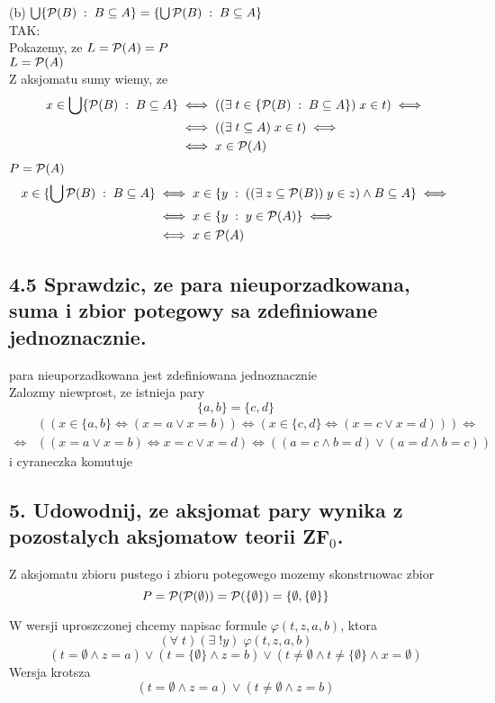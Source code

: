 \documentclass{article}
\begin{document}
\indent (b) $\bigcup\{\mathcal{P}(B)\;:\;B\subseteq A\}=\{\bigcup\mathcal{P}(B)\;:\;B\subseteq A\}$\smallskip\\
TAK:\smallskip\\
Pokazemy, ze $L= \mathcal{P}(A)= P$\smallskip\\
$L=\mathcal{P}(A)$\smallskip\\
Z aksjomatu sumy wiemy, ze
\begin{align*}
    x\in \bigcup \{\mathcal{P}(B)\;:\;B\subseteq A\}&\iff((\exists\;t\in\{\mathcal{P}(B)\;:\;B\subseteq A\})\;x\in t)\iff\\
    &\iff((\exists\;t\subseteq A)\;x\in t)\iff\\
    &\iff x\in \mathcal{P}(A)
\end{align*}
$P=\mathcal{P}(A)$
\begin{align*}
    x\in\{\bigcup\mathcal{P}(B)\;:\;B\subseteq A\}&\iff x\in \{y\;:\;((\exists\;z\subseteq \mathcal{P}(B))\;y\in z)\land B\subseteq A\}\iff\\
    &\iff x\in \{y\;:\;y\in\mathcal{P}(A)\}\iff\\
    &\iff x\in\mathcal{P}(A)
\end{align*}
\kondow

\subsection*{4.5 Sprawdzic, ze para nieuporzadkowana, suma i zbior potegowy sa zdefiniowane jednoznacznie.}
\indent para nieuporzadkowana jest zdefiniowana jednoznacznie\smallskip\\
Zalozmy niewprost, ze istnieja pary
$$\{a, b\}=\{c, d\}$$
\begin{align*}
    &((x\in\{a,b\}\iff (x=a\lor x=b))\iff (x\in \{c, d\}\iff (x=c\lor x=d)))\iff\\
    \iff&((x=a\lor x=b)\iff x=c\lor x=d)\iff ((a=c\land b=d)\lor (a=d\land b=c))
\end{align*}
i cyraneczka komutuje
\kondow

\subsection*{5. Udowodnij, ze aksjomat pary wynika z pozostalych aksjomatow teorii ZF$_0$.}

Z aksjomatu zbioru pustego i zbioru potegowego mozemy skonstruowac zbior
$$P =\mathcal{P}(\mathcal{P}(\emptyset)) = \mathcal{P}(\{\emptyset\}) = \{\emptyset, \{\emptyset\}\}$$

W wersji uproszczonej chcemy napisac formule $\varphi(t, z, a, b)$, ktora 
$$(\forall\;t)(\exists\;!y)\;\varphi(t, z, a, b)$$
$$(t=\emptyset\land z = a)\lor (t=\{\emptyset\}\land z = b)\lor (t\neq \emptyset\land t\neq\{\emptyset\} \land x = \emptyset)$$
Wersja krotsza
$$(t=\emptyset\land z=a)\lor(t\neq\emptyset\land z=b)$$
\end{document}
